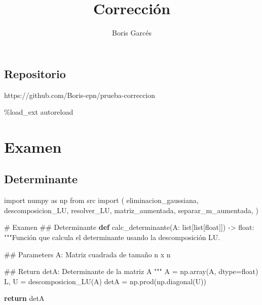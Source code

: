 \documentclass[
  letterpaper,
  DIV=11,
  numbers=noendperiod]{scrartcl}
\title{Corrección}
\author{Boris Garcés}
\date{}
\newenvironment{Shaded}{\begin{snugshade}}{\end{snugshade}}
\newcommand{\BuiltInTok}[1]{\textcolor[rgb]{0.00,0.23,0.31}{#1}}
\newcommand{\CommentTok}[1]{\textcolor[rgb]{0.37,0.37,0.37}{#1}}
\newcommand{\ControlFlowTok}[1]{\textcolor[rgb]{0.00,0.23,0.31}{\textbf{#1}}}
\newcommand{\ImportTok}[1]{\textcolor[rgb]{0.00,0.46,0.62}{#1}}
\newcommand{\KeywordTok}[1]{\textcolor[rgb]{0.00,0.23,0.31}{\textbf{#1}}}
\newcommand{\NormalTok}[1]{\textcolor[rgb]{0.00,0.23,0.31}{#1}}
\newcommand{\OperatorTok}[1]{\textcolor[rgb]{0.37,0.37,0.37}{#1}}
\renewcommand*\contentsname{Tabla de contenidos}
\newcommand\contentsname{Tabla de contenidos}
\begin{document}
\maketitle

\renewcommand*\contentsname{Tabla de Contenidos}
{
\hypersetup{linkcolor=}
\setcounter{tocdepth}{3}
\tableofcontents
}

\subsection{Repositorio}\label{repositorio}

https://github.com/Boris-epn/prueba-correccion

\begin{Shaded}
\begin{Highlighting}[]
\OperatorTok{\%}\NormalTok{load\_ext autoreload}
\end{Highlighting}
\end{Shaded}

\section{Examen}\label{examen}

\subsection{Determinante}\label{determinante}

\begin{Shaded}
\begin{Highlighting}[]
\ImportTok{import}\NormalTok{ numpy }\ImportTok{as}\NormalTok{ np}
\ImportTok{from}\NormalTok{ src }\ImportTok{import}\NormalTok{ (}
\NormalTok{    eliminacion\_gaussiana,}
\NormalTok{    descomposicion\_LU,}
\NormalTok{    resolver\_LU,}
\NormalTok{    matriz\_aumentada,}
\NormalTok{    separar\_m\_aumentada,}
\NormalTok{)}

\CommentTok{\# Examen}
\CommentTok{\#\# Determinante}
\KeywordTok{def}\NormalTok{ calc\_determinante(A: }\BuiltInTok{list}\NormalTok{[}\BuiltInTok{list}\NormalTok{[}\BuiltInTok{float}\NormalTok{]]) }\OperatorTok{{-}\textgreater{}} \BuiltInTok{float}\NormalTok{:}
    \CommentTok{"""Función que calcula el determinante usando la descomposición LU.}

\CommentTok{    \#\# Parameters}
\CommentTok{    \textasciigrave{}\textasciigrave{}A\textasciigrave{}\textasciigrave{}: Matriz cuadrada de tamaño n x n}

\CommentTok{    \#\# Return}
\CommentTok{    \textasciigrave{}\textasciigrave{}detA\textasciigrave{}\textasciigrave{}: Determinante de la matriz A}
\CommentTok{    """}
\NormalTok{    A }\OperatorTok{=}\NormalTok{ np.array(A, dtype}\OperatorTok{=}\BuiltInTok{float}\NormalTok{)}
\NormalTok{    L, U }\OperatorTok{=}\NormalTok{ descomposicion\_LU(A)}
\NormalTok{    detA }\OperatorTok{=}\NormalTok{ np.prod(np.diagonal(U))}

    \ControlFlowTok{return}\NormalTok{ detA}
\end{Highlighting}
\end{Shaded}
\end{document}
